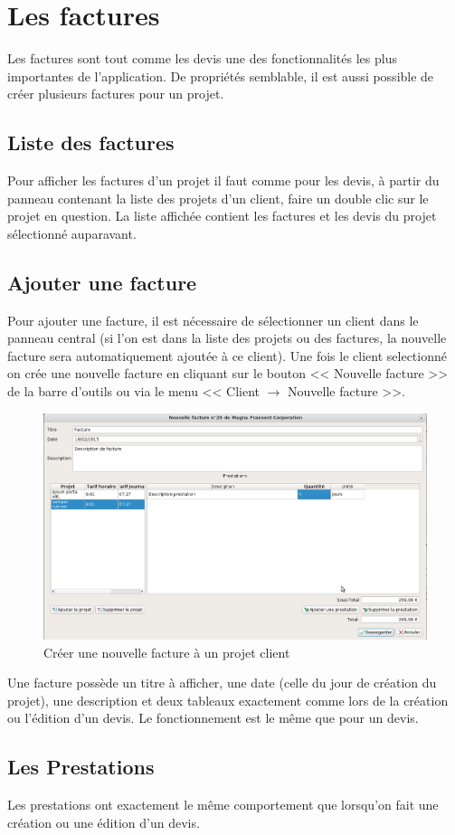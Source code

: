 \chapter{Les factures}
Les factures sont tout comme les devis une des fonctionnalités les plus importantes de l'application. De propriétés semblable, il est aussi possible de créer plusieurs factures pour un projet.
\section{Liste des factures}
Pour afficher les factures d'un projet il faut comme pour les devis, à partir du panneau contenant la liste des projets d'un client, faire un double clic sur le projet en question. La liste affichée contient les factures et les devis du projet sélectionné auparavant.

\section{Ajouter une facture}
Pour ajouter une facture, il est nécessaire de sélectionner un client dans le panneau central (si l'on est dans la liste des projets ou des factures, la nouvelle facture sera automatiquement ajoutée à ce client). Une fois le client selectionné on crée une nouvelle facture en cliquant sur le bouton << Nouvelle facture >> de la barre d'outils ou via le menu << Client $\rightarrow$ Nouvelle facture >>. 
\begin{figure}[H]
	\centering
	\includegraphics[width=15cm]{screens/creerFacture.png}
	\caption{Créer une nouvelle facture à un projet client}
\end{figure}
Une facture possède un titre à afficher, une date (celle du jour de création du projet), une description et deux tableaux exactement comme lors de la création ou l'édition d'un devis. Le fonctionnement est le même que pour un devis.
\section{Les Prestations}
Les prestations ont exactement le même comportement que lorsqu'on fait une création ou une édition d'un devis.